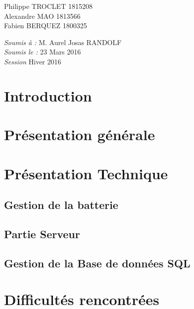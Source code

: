 \documentclass[12pt, a4paper]{article}%
\begin{document}
\begin{titlepage}
\begin{sffamily}
\begin{center}
    \begin{minipage}{0.4\textwidth}
      \begin{flushleft} \large
          Philippe TROCLET \textsc{1815208}\\
          Alexandre  MAO \textsc{1813566}\\
          Fabien  BERQUEZ \textsc{1800325}\\
      \end{flushleft}
    \end{minipage}
    \begin{minipage}{0.4\textwidth}
      \begin{flushright} \large
        \emph{Soumis à :} M. Aurel Josas RANDOLF\\
        \emph{Soumis le :} 23 Mars 2016  \\
        \emph{Session} Hiver 2016 
      \end{flushright}
    \end{minipage}

    \vfill

  \end{center}
  \end{sffamily}
\end{titlepage}%


\section{Introduction}


\section{Présentation générale}


\section{Présentation Technique}
    \subsection{Gestion de la  batterie}
    
    \subsection{Partie Serveur}
    
    \subsection{Gestion de la Base de données SQL}
    
\section{Difficultés rencontrées}
    
\end{document}
